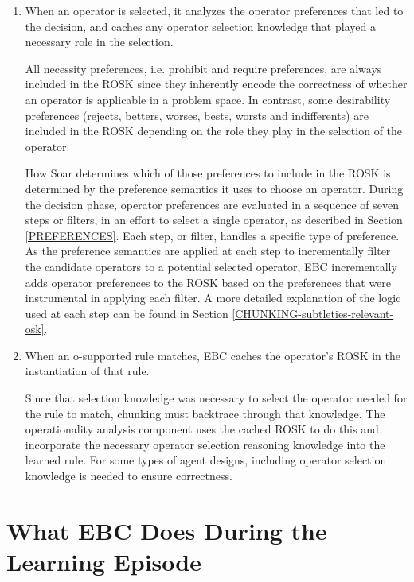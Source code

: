 \begin{enumerate}
	\item When an operator is selected, it analyzes the operator preferences that led to the decision, and caches any operator selection knowledge that played a necessary role in the selection.

	All necessity preferences, i.e. prohibit and require preferences, are always included in the ROSK since they inherently encode the correctness of whether an operator is applicable in a problem space. In contrast, some desirability preferences (rejects, betters, worses, bests, worsts and indifferents) are included in the ROSK depending on the role they play in the selection of the operator.

	How Soar determines which of those preferences to include in the ROSK is determined by the preference semantics it uses to choose an operator. During the decision phase, operator preferences are evaluated in a sequence of seven steps or filters, in an effort to select a single operator, as described in Section \ref{PREFERENCES}.  Each step, or filter, handles a specific type of preference.  As the preference semantics are applied at each step to incrementally filter the candidate operators to a potential selected operator, EBC incrementally adds operator preferences to the ROSK based on the preferences that were instrumental in applying each filter.  A more detailed explanation of the logic used at each step can be found in Section \ref{CHUNKING-subtleties-relevant-osk}.

	\item When an o-supported rule matches, EBC caches the operator's ROSK in the instantiation of that rule.

	Since that selection knowledge was necessary to select the operator needed for the rule to match, chunking must backtrace through that knowledge.  The operationality analysis component uses the cached ROSK to do this and incorporate the necessary operator selection reasoning knowledge into the learned rule.  For some types of agent designs, including operator selection knowledge is needed to ensure correctness.
\end{enumerate}


\section{What EBC Does During the Learning Episode}
\label{CHUNKING-during}

